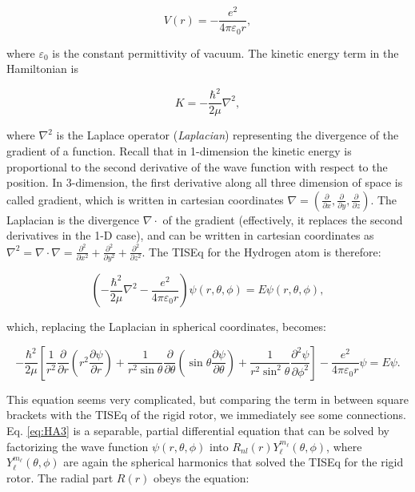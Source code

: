 \documentclass[
  9pt,
]{extbook}
\theoremstyle{definition}
\theoremstyle{definition}
\theoremstyle{definition}
\theoremstyle{remark}
\begin{document}
\begin{equation}
V(r) = - \frac{e^2}{4 \pi \varepsilon_0 r},
\label{eq:HA1}
\end{equation}

where \(\varepsilon_0\) is the constant permittivity of vacuum.
The kinetic energy term in the Hamiltonian is

\begin{equation}
K = - \frac{\hbar^2}{2 \mu} \nabla^2,
\label{eq:HA2}
\end{equation}

where \(\nabla^2\) is the Laplace operator (\emph{Laplacian}) representing the divergence of the gradient of a function. Recall that in 1-dimension the kinetic energy is proportional to the second derivative of the wave function with respect to the position. In 3-dimension, the first derivative along all three dimension of space is called gradient, which is written in cartesian coordinates \(\nabla = \left(\frac{\partial}{\partial x},\frac{\partial}{\partial y},\frac{\partial}{\partial z} \right)\). The Laplacian is the divergence \(\nabla \cdot\) of the gradient (effectively, it replaces the second derivatives in the 1-D case), and can be written in cartesian coordinates as \(\nabla^2=\nabla\cdot\nabla=\frac{\partial^2}{\partial x^2}+\frac{\partial^2}{\partial y^2}+\frac{\partial^2}{\partial z^2}\). The TISEq for the Hydrogen atom is therefore:

\begin{equation}
{\displaystyle \left(-{\frac {\hbar ^{2}}{2\mu }}\nabla ^{2}-{\frac {e^{2}}{4\pi \varepsilon _{0}r}}\right)\psi (r,\theta ,\phi )=E\psi (r,\theta ,\phi )},
\label{eq:HA2b}
\end{equation}

which, replacing the Laplacian in spherical coordinates, becomes:

\begin{equation}
-{\frac {\hbar ^{2}}{2\mu }}\left[{\frac {1}{r^{2}}}{\frac {\partial }{\partial r}}\left(r^{2}{\frac {\partial \psi }{\partial r}}\right)+{\frac {1}{r^{2}\sin \theta }}{\frac {\partial }{\partial \theta }}\left(\sin \theta {\frac {\partial \psi }{\partial \theta }}\right)+{\frac {1}{r^{2}\sin ^{2}\theta }}{\frac {\partial ^{2}\psi }{\partial \phi ^{2}}}\right]-{\frac {e^{2}}{4\pi \varepsilon _{0}r}}\psi =E\psi.
\label{eq:HA3}
\end{equation}

This equation seems very complicated, but comparing the term in between square brackets with the TISEq of the rigid rotor, we immediately see some connections. Eq. \eqref{eq:HA3} is a separable, partial differential equation that can be solved by factorizing the wave function \(\psi(r, \theta, \phi)\) into \(R_{nl}(r)Y_{\ell}^{m_{\ell}}(\theta, \phi)\), where \(Y_{\ell}^{m_{\ell}}(\theta, \phi)\) are again the spherical harmonics that solved the TISEq for the rigid rotor. The radial part \(R(r)\) obeys the equation:
\end{document}
